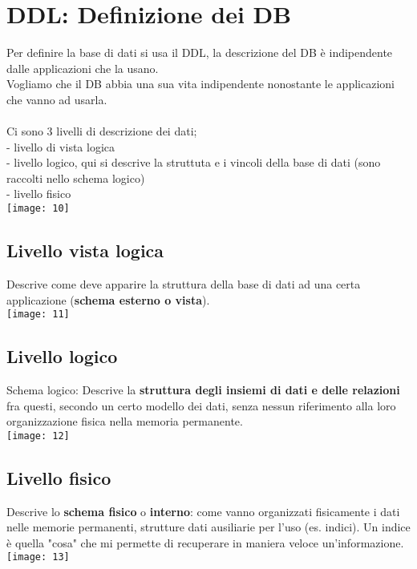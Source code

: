 \documentclass[12pt, letterpaper]{article}
\begin{document}
\section{DDL: Definizione dei DB}

Per definire la base di dati si usa il DDL, la descrizione del DB è indipendente dalle applicazioni che la usano.\\
Vogliamo che il DB abbia una sua vita indipendente nonostante le applicazioni che vanno ad usarla.
\\
\\
Ci sono 3 livelli di descrizione dei dati;\\
- livello di vista logica\\
- livello logico, qui si descrive la struttuta e i vincoli della base di dati (sono raccolti nello schema logico)\\
- livello fisico\\

\texttt{[image: 10]}
\newpage

   \subsection{Livello vista logica} Descrive come deve apparire la struttura della base di dati ad una certa
      applicazione (\textbf{schema esterno o vista}).\\
      \texttt{[image: 11]}
   \subsection{Livello logico} Schema logico: Descrive la \textbf{struttura degli insiemi di dati e delle relazioni} fra
      questi, secondo un certo modello dei dati, senza nessun riferimento alla loro
      organizzazione fisica nella memoria permanente.\\
      \texttt{[image: 12]}
   \subsection{Livello fisico} Descrive lo \textbf{schema fisico} o \textbf{interno}: come vanno organizzati fisicamente i dati nelle memorie permanenti, strutture dati ausiliarie per l’uso (es. indici). Un indice è quella "cosa" che mi permette di recuperare in maniera veloce un'informazione.\\
      \texttt{[image: 13]}
\end{document}

